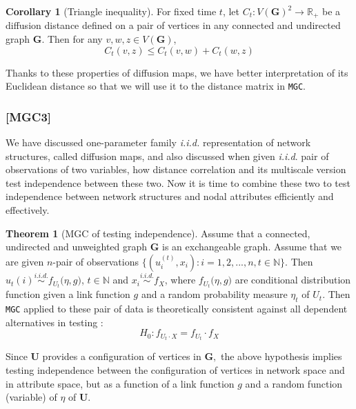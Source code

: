 \documentclass[12pt]{article}
\theoremstyle{definition}
\newtheorem{theorem}{Theorem}[section]
\newtheorem{corollary}{Corollary}[theorem]
\begin{document}
\begin{corollary}[Triangle inequality]
\label{corollary1}
For fixed time $t$, let $C_{t} : V(\mathbf{G})^2 \rightarrow \mathbb{R}_{+}$ be a diffusion distance defined on a pair of vertices in any connected and undirected graph $\mathbf{G}$. Then for any $v, w, z \in V(\mathbf{G})$,  
\begin{equation}
C_{t}(v,z) \leq C_{t}(v,w) + C_{t}(w,z)
\end{equation}
\end{corollary}	

Thanks to these properties of diffusion maps, we have better interpretation of its Euclidean distance so that we will use it to the distance matrix in \texttt{MGC}.

\subsubsection{[MGC3]}


We have discussed one-parameter family \textit{i.i.d.} representation of network structures, called diffusion maps, and also discussed when given \textit{i.i.d}. pair of observations of two variables, how distance correlation and its multiscale version test independence between these two. Now it is time to combine these two to test independence between network structures and nodal attributes efficiently and effectively.

\begin{theorem}[MGC of testing independence]
	\label{theorem1}
Assume that a connected, undirected and unweighted graph $\mathbf{G}$ is an exchangeable graph.  Assume that we are given $n$-pair of observations $\{ (u^{(t)}_{i}, x_{i}): i = 1,2,... , n  , t \in \mathbb{N} \}$. Then $u_{t}(i) \overset{i.i.d.}{\sim} f_{U_t} \big(  \eta, g \big)$, $t \in \mathbb{N}$ and $x_{i} \overset{i.i.d.}{\sim} f_{X}$, where $f_{U_t} \big( \eta, g \big)$ are conditional distribution function given a link function $g$ and a random probability measure $\eta_{t}$ of $U_t$. Then \texttt{MGC} applied to these pair of data is theoretically consistent against all dependent alternatives in testing :
$$H_{0} : f_{U_t \cdot X} = f_{U_t} \cdot f_{X}$$
\end{theorem}


Since $\boldsymbol{U}$ provides a configuration of vertices in $\boldsymbol{G},$ the above hypothesis implies testing independence between the configuration of vertices in network space and in attribute space, but as a function of a link function $g$ and a random function (variable) of $\eta$ of $\mathbf{U}$.
\end{document}
